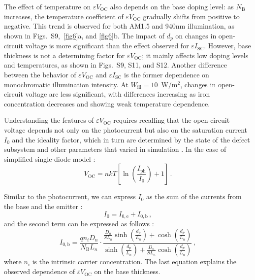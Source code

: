 \documentclass[a4paper,fleqn]{cas-sc}
\begin{document}
The effect of temperature on $\varepsilon V_\mathrm{OC}$ also depends on the base doping level:
as $N_\mathrm{B}$ increases, the temperature coefficient of $\varepsilon V_\mathrm{OC}$ gradually shifts from positive to negative.
This trend is observed for both AM1.5 and 940nm illumination, as shown in Figs.~S9,~\ref{fig6}a, and \ref{fig6}b.
The impact of $d_p$ on changes in open-circuit voltage is more significant than the effect observed for $\varepsilon I_\mathrm{SC}$.
However, base thickness is not a determining factor for $\varepsilon V_\mathrm{OC}$;
it mainly affects low doping levels and temperatures, as shown in Figs.~S9, S11, and S12.
Another difference between the behavior of $\varepsilon V_\mathrm{OC}$ and $\varepsilon I_\mathrm{SC}$
is the former dependence on monochromatic illumination intensity.
At $W_\mathrm{ill} = 10$~W/m$^{2}$, changes in open-circuit voltage are less significant,
with differences increasing as iron concentration decreases and showing weak temperature dependence.

Understanding the features of $\varepsilon V_\mathrm{OC}$ requires recalling
that the open-circuit voltage depends not only on the photocurrent
but also on the saturation current $I_0$ and the ideality factor,
which in turn are determined by the state of the defect subsystem and other parameters
that varied in simulation \cite{Olikh2019SM,YangHandbookPVSi}.
In the case of simplified single-diode model \cite{YangHandbookPVSi}:
\begin{equation}
\label{eq5}
     V_\mathrm{OC} = nkT\left[ {\ln\left( {\frac{I_\mathrm{ph}}{I_0}} \right)+1} \right]\,.
\end{equation}

Similar to the photocurrent, we can express $I_\mathrm{0}$ as the sum of the currents from the base and the emitter \cite{Markvart}:
\begin{equation}
\label{eq6}
     I_0 = I_\mathrm{0,e}+I_\mathrm{0,b}\,,
\end{equation}
and the second term can be expressed as follows \cite{Goetzberger1998}:
\begin{equation}
\label{eq7}
     I_\mathrm{0,b}=\frac{qn_i D_n}{N_\mathrm{B}L_n}\cdot\frac{\frac{D_n}{SL_n}\sinh\left( \frac{d_p}{L_n} \right)+\cosh\left( \frac{d_p}{L_n} \right)}{\sinh\left( \frac{d_p}{L_n} \right)+\frac{D_n}{SL_n}\cosh\left( \frac{d_p}{L_n} \right)}\,,
\end{equation}
where
$n_i$ is the intrinsic carrier concentration.
The last equation explains the observed dependence of $\varepsilon V_\mathrm{OC}$ on the base thickness.
\end{document}
